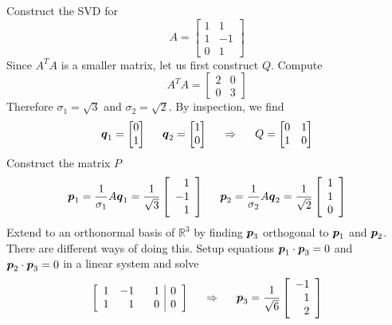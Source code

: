 \begin{example}
Construct the SVD for
$$
A = \left[ \begin{array}{rr} 1 & 1 \\ 1 & -1 \\ 0 & 1 \end{array} \right]
$$
Since $A^TA$ is a smaller matrix, let us first construct $Q$. Compute
$$
A^TA = \begin{bmatrix} 2 & 0 \\ 0 & 3 \end{bmatrix}
$$
Therefore $\sigma_1 = \sqrt{3}$ and $\sigma_2 = \sqrt{2}$. By inspection, we find
$$
\boldsymbol{q}_1 = \begin{bmatrix} 0 \\ 1 \end{bmatrix}
\hspace{5mm}
\boldsymbol{q}_2 = \begin{bmatrix} 1 \\ 0 \end{bmatrix}
\hspace{5mm}
\Rightarrow
\hspace{5mm}
Q = \begin{bmatrix} 0 & 1 \\ 1 & 0 \end{bmatrix}
$$
Construct the matrix $P$
$$
\boldsymbol{p}_1 = \frac{1}{\sigma_1} A\boldsymbol{q}_1 = \frac{1}{\sqrt{3}} \left[ \begin{array}{r} 1 \\ -1 \\ 1 \end{array} \right]
\hspace{5mm}
\boldsymbol{p}_2 = \frac{1}{\sigma_2} A\boldsymbol{q}_2 = \frac{1}{\sqrt{2}} \left[ \begin{array}{r} 1 \\ 1 \\ 0 \end{array} \right]
$$
Extend to an orthonormal basis of $\mathbb{R}^3$ by finding $\boldsymbol{p}_3$ orthogonal to $\boldsymbol{p}_1$ and $\boldsymbol{p}_2$. There are different ways of doing this. Setup equations $\boldsymbol{p}_1 \cdot \boldsymbol{p}_3 = 0$ and $\boldsymbol{p}_2 \cdot \boldsymbol{p}_3 = 0$ in a linear system and solve
$$
\left[ \begin{array}{rrr|r} 1 & -1 & \phantom{+}1 & 0 \\ 1 & 1 & 0 & 0 \end{array} \right]
\hspace{5mm}
\Rightarrow
\hspace{5mm}
\boldsymbol{p}_3 = \frac{1}{\sqrt{6}} \left[ \begin{array}{r} -1 \\ 1 \\ 2 \end{array} \right]
$$
\end{example}

